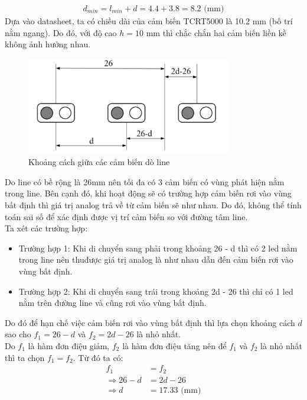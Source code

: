             \begin{align}
                d_{min} = l_{min} + d = 4.4 + 3.8 = 8.2 \text{ (mm)}
                \label{eq:4-4}
            \end{align}
            \hspace*{0.6cm}Dựa vào datasheet, ta có chiều dài của cảm biến TCRT5000 là 10.2 mm (bố trí nằm ngang). Do đó, với độ cao $h = 10$ mm thì chắc chắn hai cảm biến liền kề không ảnh hưởng nhau.\\[0.4cm]
            \begin{figure}[H]
                \centering
                \includegraphics[width=0.8\textwidth]{pictures/chapter4/c4_p9_SensorDistance.png}
                \caption{Khoảng cách giữa các cảm biến dò line}
                \label{fig:4-14}
            \end{figure}
            Do line có bề rộng là 26mm nên tối đa có 3 cảm biến có vùng phát hiện nằm trong line. Bên cạnh đó, khi hoạt động sẽ có trường hợp cảm biến rơi vào vùng bất định thì giá trị analog trả về từ cảm biến sẽ như nhau. Do đó, không thể tính toán sai số để xác định được vị trí cảm biến so với đường tâm line. \\
            \hspace*{0.6cm}Ta xét các trường hợp:
            \begin{itemize}
                \item Trường hợp 1: Khi di chuyển sang phải trong khoảng 26 - d thì có 2 led nằm trong line nên thuđược giá trị analog là như nhau dẫn đến cảm biến rơi vào vùng bất định. 
                \item Trường hợp 2: Khi di chuyển sang trái trong khoảng 2d - 26 thì chỉ có 1 led nằm trên đường line và cũng rơi vào vùng bất định. 
            \end{itemize}
            \hspace*{0.6cm}Do đó để hạn chế việc cảm biến rơi vào vùng bất định thì lựa chọn khoảng cách $d$ sao cho $f_1 = 26 - d$ và $f_2 = 2d - 26$ là nhỏ nhất. \\
            \hspace*{0.6cm}Do $f_1$ là hàm đơn điệu giảm, $f_2$ là hàm đơn điệu tăng nên để $f_1$ và $f_2$ là nhỏ nhất thì ta chọn $f_1 = f_2$. Từ đó ta có:
            \begin{align}
                f_1 &= f_2 \label{eq:4-5}\\
                \Rightarrow 26 - d &= 2d - 26 \nonumber \\
                \Rightarrow d &= 17.33 \text{ (mm)} \nonumber
            \end{align}

